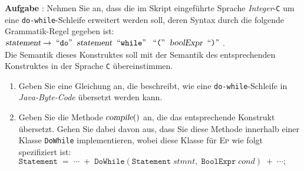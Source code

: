 \documentclass{article}
\newcounter{aufgabe}
\newcommand{\quoted}[1]{\;\mbox{``\texttt{#1}''}\;}
\newcommand{\exercise}{\vspace*{0.1cm}

\stepcounter{aufgabe}
\vspace*{0.3cm}

\noindent
\textbf{Aufgabe \arabic{aufgabe}}: }
\begin{document}
\exercise
Nehmen Sie an, dass die im Skript eingef\"uhrte Sprache \textsl{Integer}-\texttt{C} um eine 
\texttt{do-while}-Schleife erweitert werden soll, deren Syntax durch die folgende Grammatik-Regel gegeben ist:
\\[0.2cm]
\hspace*{1.3cm}
$\textsl{statement} \rightarrow \quoted{do}\; \textsl{statement}\; \quoted{while}\;
 \quoted{(} \;\textsl{boolExpr} \;\quoted{)}$.
\\[0.2cm]
Die Semantik dieses Konstruktes soll mit der Semantik des entsprechenden Konstruktes in
der Sprache \texttt{C} \"ubereinstimmen.
\begin{enumerate}
\item Geben Sie eine Gleichung an, die beschreibt, wie eine \texttt{do-while}-Schleife in
      \textsl{Java-Byte-Code} \"ubersetzt werden kann.
\item Geben Sie die Methode $\textsl{compile}()$ an, die das entsprechende
      Konstrukt \"ubersetzt.  Gehen Sie dabei davon aus, dass Sie diese Methode innerhalb
      einer Klasse \texttt{DoWhile} implementieren, wobei diese Klasse f\"ur \textsc{Ep}
      wie folgt spezifiziert ist:
      \\[0.2cm]
      \hspace*{1.3cm}
      $\texttt{Statement} \;=\; \cdots \;+\; \texttt{DoWhile}(\texttt{Statement}\; stmnt,\;
      \mathtt{BoolExpr}\; cond)\; +\; \cdots; $      
\end{enumerate}
\end{document}
